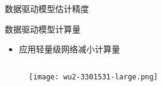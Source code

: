 \begin{frame}
\begin{columns}[t]
\begin{column}{0.5\textwidth}
\begin{block}{数据驱动模型估计精度}
{\begin{itemize}
					\end{itemize}			    
			    }
			\end{block}
			\begin{block}{数据驱动模型计算量}
			    {
			        \footnotesize
					\begin{itemize}
						\item 应用轻量级网络减小计算量
					\end{itemize}
				}
			\end{block}
		\end{column}
	\end{columns}
	\vspace{-0.2cm}
	\begin{columns}[b]
		\begin{column}{0.5\textwidth}
		   	\begin{figure}
				\texttt{[image: wu2-3301531-large.png]}
		   	\end{figure}
		\end{column}
		\begin{column}{0.5\textwidth}
		\end{column}
	\end{columns}
\end{frame}

